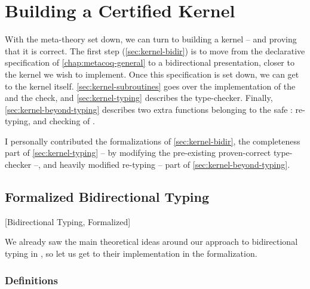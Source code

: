\chapter{Building a Certified Kernel}
\label{chap:kernel-correctness}

\margintoc

With the meta-theory set down, we can turn to building a kernel – and proving that it is
correct. The first step (\cref{sec:kernel-bidir})
is to move from the declarative specification of
\cref{chap:metacoq-general} to a bidirectional presentation,
closer to the kernel we wish to implement.
Once this specification is set down, we can get to the kernel itself.
\cref{sec:kernel-subroutines} goes over the implementation of the  and the
 check, and \cref{sec:kernel-typing} describes the type-checker.
Finally, \cref{sec:kernel-beyond-typing} describes two extra functions belonging to the safe
: re-typing, and checking of .

I personally contributed the formalizations of \cref{sec:kernel-bidir},
the completeness part of \cref{sec:kernel-typing} –
by modifying the pre-existing proven-correct type-checker –,
and heavily modified re-typing – part of \cref{sec:kernel-beyond-typing}.

\section{Formalized Bidirectional Typing}
  [Bidirectional Typing, Formalized]
\label{sec:kernel-bidir}

We already saw the main theoretical ideas around our approach to bidirectional typing in
, so let us get to their implementation in the formalization.

\subsection{Definitions}

